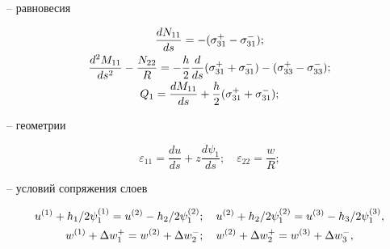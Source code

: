 -- равновесия

\begin{equation*}

\begin{array}{c}

\displaystyle

\frac{dN_{11} }{ds}=-(\sigma _{31}^{+} -\sigma _{31}^{-} ); \vspace{1mm} \\

\displaystyle

\frac{d^2M_{11} }{ds^2}-\frac{N_{22} }{R}=-\frac{h}{2}\frac{d}{ds}

(\sigma _{31}^{+} +\sigma _{31}^{-} )-(\sigma _{33}^{+} -\sigma _{33}^{-} ); \vspace{1mm}

\\

\displaystyle

Q_1 =\frac{dM_{11} }{ds}+\frac{h}{2}(\sigma _{31}^{+} +\sigma _{31}^{-} );

\end{array}

\end{equation*}



-- геометрии

\begin{equation*}

\varepsilon_{11} =\frac{du}{ds}+z\frac{d\psi_1 }{ds}; \quad \varepsilon_{22} =\frac{w}{R};

\end{equation*}



-- условий сопряжения слоев

\begin{gather}


\notag

u^{(1)}+{h_1 }/{2}\psi _1^{(1)} =u^{(2)}-{h_2}/{2}\psi _1^{(2)} ;

\quad

u^{(2)}+{h_2}/{2}\psi _1^{(2)} =u^{(3)}-{h_3}/{2}\psi _1^{(3)} ,

\\

\label{pikul:eq8}

w^{(1)}+\Delta w_1^{+} =w^{(2)}+\Delta w_2^{-} ;

\quad

w^{(2)}+\Delta w_2^{+} =w^{\left( 3 \right)}+\Delta w_3^{-} ,

\end{gather}



